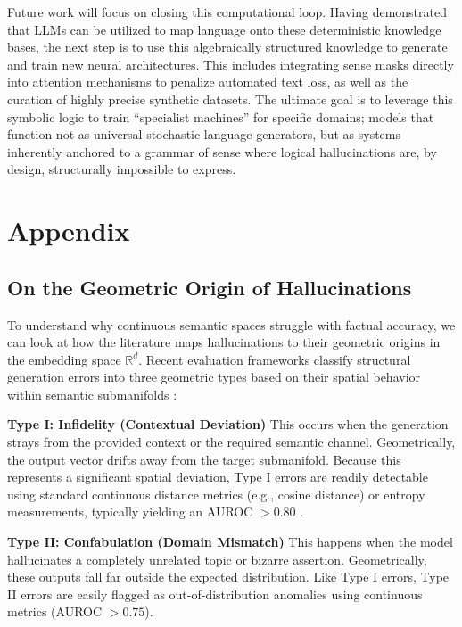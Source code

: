 \documentclass{article}
\begin{document}
Future work will focus on closing this computational loop. Having
demonstrated that LLMs can be utilized to map language onto these
deterministic knowledge bases, the next step is to use this
algebraically structured knowledge to generate and train new neural
architectures. This includes integrating sense masks directly into
attention mechanisms to penalize automated text loss, as well as the
curation of highly precise synthetic datasets. The ultimate goal is to
leverage this symbolic logic to train ``specialist machines'' for
specific domains; models that function not as universal stochastic
language generators, but as systems inherently anchored to a grammar of
sense where logical hallucinations are, by design, structurally
impossible to express.




\hypertarget{appendix}{%
\section{Appendix}\label{appendix}}

\hypertarget{on-the-geometric-origin-of-hallucinations}{%
\subsection{\texorpdfstring{On the Geometric Origin of Hallucinations
\label{app:hallucinations}}{On the Geometric Origin of Hallucinations }}\label{on-the-geometric-origin-of-hallucinations}}

To understand why continuous semantic spaces struggle with factual
accuracy, we can look at how the literature maps hallucinations to their
geometric origins in the embedding space \(\mathbb{R}^d\). Recent
evaluation frameworks classify structural generation errors into three
geometric types based on their spatial behavior within semantic
submanifolds \citep{wei2024measuring, sansford2024grapheval}:

\textbf{Type I: Infidelity (Contextual Deviation)} This occurs when the
generation strays from the provided context or the required semantic
channel. Geometrically, the output vector drifts away from the target
submanifold. Because this represents a significant spatial deviation,
Type I errors are readily detectable using standard continuous distance
metrics (e.g., cosine distance) or entropy measurements, typically
yielding an AUROC \(> 0.80\) \citep{wei2024measuring}.

\textbf{Type II: Confabulation (Domain Mismatch)} This happens when the
model hallucinates a completely unrelated topic or bizarre assertion.
Geometrically, these outputs fall far outside the expected distribution.
Like Type I errors, Type II errors are easily flagged as
out-of-distribution anomalies using continuous metrics (AUROC
\(> 0.75\)).
\end{document}
